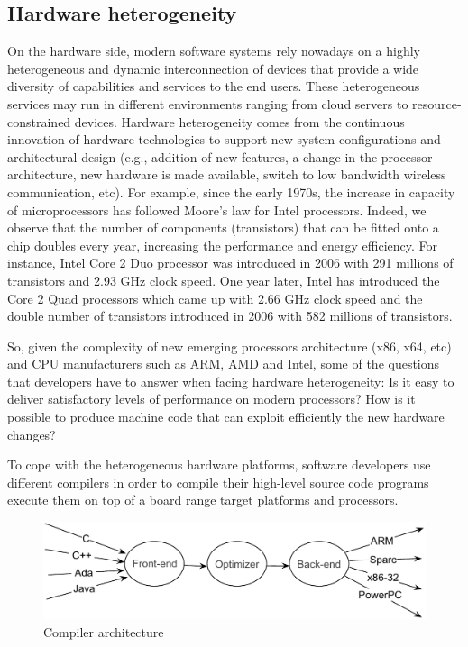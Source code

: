 

\subsection{Hardware heterogeneity}
On the hardware side, modern software systems rely nowadays on a highly heterogeneous and dynamic interconnection of devices that provide a wide diversity of capabilities and services to the end users.
These heterogeneous services may run in different environments ranging from cloud servers to resource-constrained devices.
Hardware heterogeneity comes from the continuous innovation of hardware technologies to support new system configurations and architectural design (e.g., addition of new features, a change in the processor architecture, new hardware is made available, switch to low bandwidth wireless communication, etc). 
For example, since the early 1970s, the increase in capacity of microprocessors has followed Moore's law for Intel processors. Indeed, we observe that the number of components (transistors) that can be fitted onto a chip doubles every year, increasing the performance and energy efficiency.
For instance, Intel Core 2 Duo processor was introduced in 2006 with 291 millions of transistors and 2.93 GHz clock speed. One year later, Intel has introduced the Core 2 Quad processors which came up with 2.66 GHz clock speed and the double number of transistors introduced in 2006 with 582 millions of transistors.

So, given the complexity of new emerging processors architecture (x86, x64, etc) and CPU manufacturers such as ARM, AMD and Intel, some of the questions that developers have to answer when facing hardware heterogeneity: 
Is it easy to deliver satisfactory levels of performance on modern processors? How is it possible to produce machine code that can exploit efficiently the new hardware changes? 

To cope with the heterogeneous hardware platforms, software developers use different compilers in order to compile their high-level source code programs execute them on top of a board range target platforms and processors. 

\begin{figure}[h]
	\center
	\includegraphics[scale=0.65]{Background/fig/compilers}
	\caption{Compiler architecture}
\end{figure}

